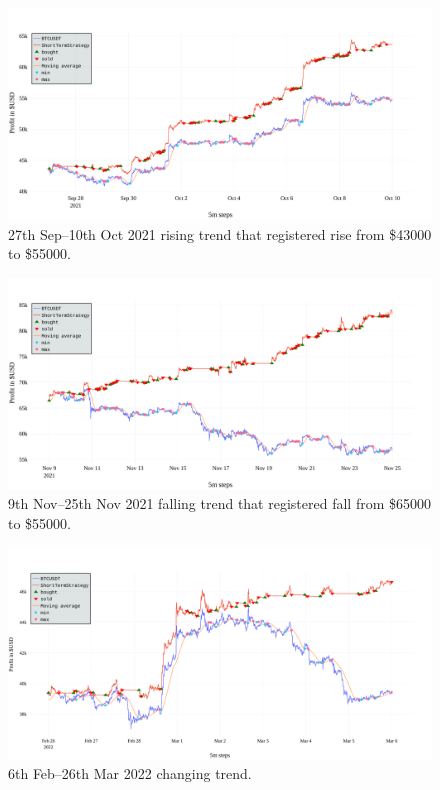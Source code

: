 \begin{figure}[!hbt]
    \centering
    \includegraphics[width=\columnwidth]{figures/short-term-rising.pdf}
    \caption{27th Sep--10th Oct 2021 rising trend that registered rise from \$43000 to \$55000.}
    \label{figure-short-term-rising}
\end{figure}

\begin{figure}[!hbt]
    \centering
    \includegraphics[width=\columnwidth]{figures/short-term-falling.pdf}
    \caption{9th Nov--25th Nov 2021 falling trend that registered fall from \$65000 to \$55000.}
    \label{figure-short-term-falling}
\end{figure}

\begin{figure}[!hbt]
    \centering
    \includegraphics[width=\columnwidth]{figures/short-term-changing.pdf}
    \caption{6th Feb--26th Mar 2022 changing trend.}
    \label{figure-short-term-changing}
\end{figure}


